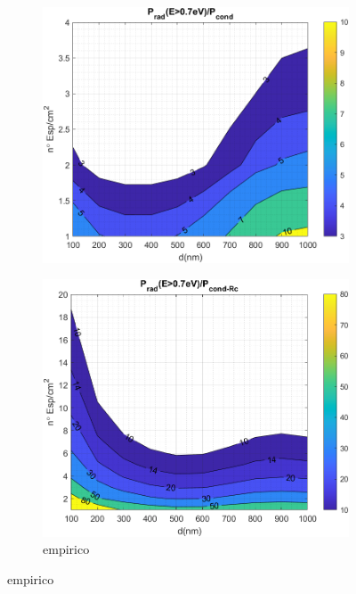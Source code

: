 \begin{figure}[H]
	\centering
	\begin{subfigure}[b]{0.49\textwidth}
		\centering
			\includegraphics[width=1.00\textwidth]{figuras/Resultados/RelacionCondRad/SS.png}
		\caption{ }
		\label{fig:rel_SsSiO2Ge}
	\end{subfigure}
	\hfill
	\begin{subfigure}[b]{0.49\textwidth}
		\centering
			\includegraphics[width=1.00\textwidth]{figuras/Resultados/RelacionCondRad/SS_Rc_empirico.png}
		\caption{ empirico}

\end{subfigure}
\end{figure}

